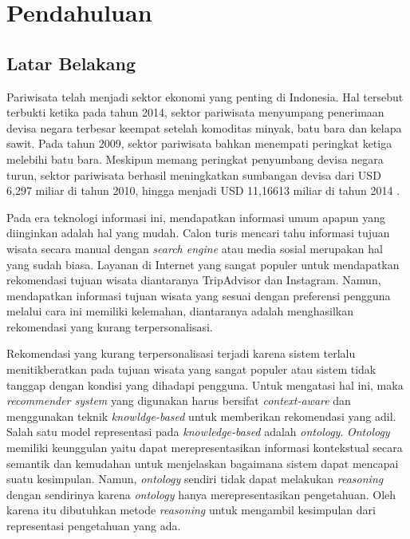 \chapter{Pendahuluan}
\section{Latar Belakang}

Pariwisata telah menjadi sektor ekonomi yang penting di Indonesia. Hal tersebut terbukti ketika pada tahun 2014, sektor pariwisata menyumpang penerimaan devisa negara terbesar
keempat setelah komoditas minyak, batu bara dan kelapa sawit. Pada tahun 2009, sektor pariwisata bahkan menempati peringkat ketiga melebihi batu bara\cite{bps1}. Meskipun memang peringkat penyumbang devisa negara turun, sektor pariwisata berhasil meningkatkan sumbangan devisa dari USD 6,297 miliar di tahun 2010, hingga menjadi USD 11,16613 miliar di tahun 2014 \cite{bps2}.
\par
Pada era teknologi informasi ini, mendapatkan informasi umum apapun yang diinginkan adalah hal yang mudah. Calon turis mencari tahu informasi tujuan wisata secara manual dengan \textit{search engine} atau media sosial merupakan hal yang sudah biasa. Layanan di Internet yang sangat populer untuk mendapatkan rekomendasi tujuan wisata diantaranya TripAdvisor dan Instagram. Namun, mendapatkan informasi tujuan wisata yang sesuai dengan preferensi pengguna melalui cara ini memiliki kelemahan, diantaranya adalah menghasilkan rekomendasi yang kurang terpersonalisasi.
\par 
Rekomendasi yang kurang terpersonalisasi terjadi karena sistem terlalu menitikberatkan pada tujuan wisata yang sangat populer atau sistem tidak tanggap dengan kondisi yang dihadapi pengguna. Untuk mengatasi hal ini, maka \textit{recommender system} yang digunakan harus bersifat \textit{context-aware}\cite{alhazbi2013} dan menggunakan teknik \textit{knowldge-based} untuk memberikan rekomendasi yang adil. Salah satu model representasi pada \textit{knowledge-based} adalah \textit{ontology}. \textit{Ontology} memiliki keunggulan yaitu dapat merepresentasikan informasi kontekstual secara semantik dan kemudahan untuk menjelaskan bagaimana sistem dapat mencapai suatu kesimpulan. Namun, \textit{ontology} sendiri tidak dapat melakukan \textit{reasoning} dengan sendirinya karena \textit{ontology} hanya merepresentasikan pengetahuan. Oleh karena itu dibutuhkan metode \textit{reasoning} untuk mengambil kesimpulan dari representasi pengetahuan yang ada.
\par
